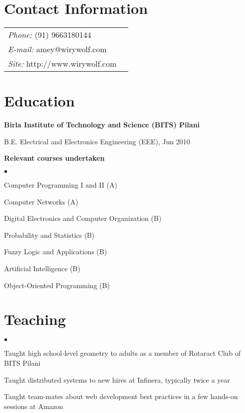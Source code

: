 \documentclass[margin,line]{res}
\newenvironment{list1}{
  \begin{list}{\ding{113}}{%
      \setlength{\itemsep}{0in}
      \setlength{\parsep}{0in} \setlength{\parskip}{0in}
      \setlength{\topsep}{0in} \setlength{\partopsep}{0in}
      \setlength{\leftmargin}{0.17in}}}{\end{list}}
\newenvironment{list2}{
  \begin{list}{$\bullet$}{%
      \setlength{\itemsep}{0in}
      \setlength{\parsep}{0in} \setlength{\parskip}{0in}
      \setlength{\topsep}{0in} \setlength{\partopsep}{0in}
      \setlength{\leftmargin}{0.2in}}}{\end{list}}
\begin{document}

\begin{resume}
\section{\sc Contact Information}
\vspace{.05in}
\begin{tabular}{@{}p{2in}p{4in}}
{\it Phone:}  (91) 9663180144 \\
{\it E-mail:}  amey@wirywolf.com \\
{\it Site:} http://www.wirywolf.com \\
\end{tabular}

\section{\sc Education}
{\bf Birla Institute of Technology and Science (BITS) Pilani} \\
\vspace*{-.1in}
\begin{list1}
\item[] B.E. Electrical and Electronics Engineering (EEE), Jun 2010
\end{list1}

{\bf Relevant courses undertaken} \\
\begin{list2}
\item Computer Programming I and II (A)
\item Computer Networks (A)
\item Digital Electronics and Computer Organization (B)
\item Probability and Statistics (B)
\item Fuzzy Logic and Applications (B)
\item Artificial Intelligence (B)
\item Object-Oriented Programming (B)
\end{list2}

\section{\sc Teaching}
\begin{list2}
\item Taught high school-level geometry to adults as a member of Rotaract Club of BITS Pilani
\item Taught distributed systems to new hires at Infinera, typically twice a year
\item Taught team-mates about web development best practices in a few hands-on sessions at Amazon
\end{list2}


\end{resume}
\end{document}
